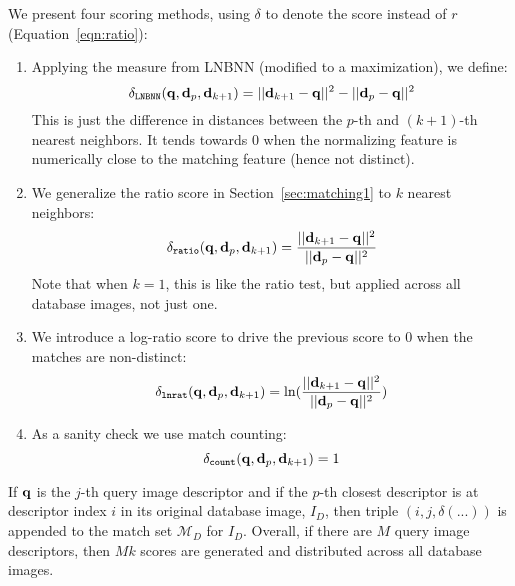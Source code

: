 We present four scoring methods, using $\delta$ to denote the score
instead of $r$ (Equation~\ref{eqn:ratio}):

\begin{enumerate}
\item Applying the measure from LNBNN \cite{cvpr11McCannLNBNN} (modified to a maximization),  we define:
\begin{equation}
 \delta_{\tt LNBNN} (\mathbf{q},\mathbf{d}_{p},\mathbf{d}_{k+1}) = ||\mathbf{d}_{k+1} -  \mathbf{q}||^2  -  ||\mathbf{d}_{p} -  \mathbf{q}||^2
\end{equation}
This is just the difference in distances between the $p$-th and
$(k+1)$-th nearest neighbors. It tends towards 0 when the normalizing
feature is numerically close to the matching feature (hence not distinct).

\item We generalize the ratio score in Section~\ref{sec:matching1} to $k$ nearest neighbors:
\begin{equation}
  \delta_{\tt ratio} (\mathbf{q},\mathbf{d}_{p},\mathbf{d}_{k+1})  = \frac{||\mathbf{d}_{k+1} -  \mathbf{q}||^2}{||\mathbf{d}_{p} -  \mathbf{q}||^2}
\end{equation}
Note that when $k=1$, this is like the ratio test, but applied across
all database images, not just one.

\item We introduce a log-ratio score to drive the previous score to 0 when the matches are non-distinct:
\begin{equation}
  \delta_{\tt lnrat} (\mathbf{q},\mathbf{d}_{p},\mathbf{d}_{k+1})  = \ln(\frac{||\mathbf{d}_{k+1} -  \mathbf{q}||^2}{||\mathbf{d}_{p} -  \mathbf{q}||^2})
\end{equation}

\item As a sanity check we use match counting:
\begin{equation}
 \delta_{\tt count} (\mathbf{q},\mathbf{d}_{p},\mathbf{d}_{k+1}) = 1
\end{equation}
\end{enumerate}

If $\mathbf{q}$ is the $j$-th query image descriptor and if the $p$-th
closest descriptor is at descriptor index $i$ in its original database
image, $I_D$, then triple $(i,j,\delta(...))$ is appended to the match
set $\mathcal{M}_{D}$ for $I_D$.  Overall, if there are $M$ query
image descriptors, then $M k$ scores are generated and distributed
across all database images.

